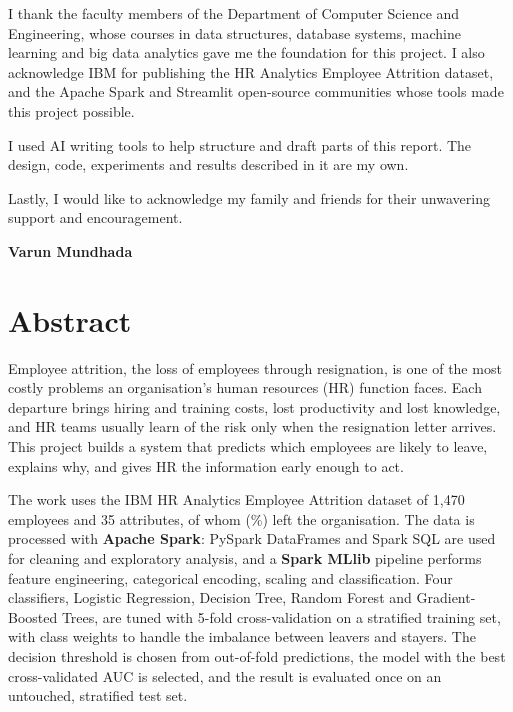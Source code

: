 \documentclass[12pt,a4paper]{report}
\begin{document}
I thank the faculty members of the Department of Computer Science and Engineering, whose courses in data structures, database systems, machine learning and big data analytics gave me the foundation for this project. I also acknowledge IBM for publishing the HR Analytics Employee Attrition dataset, and the Apache Spark and Streamlit open-source communities whose tools made this project possible.

I used AI writing tools to help structure and draft parts of this report. The design, code, experiments and results described in it are my own.

Lastly, I would like to acknowledge my family and friends for their unwavering support and encouragement.

\vspace{1cm}
\hfill \textbf{Varun Mundhada}


\chapter*{Abstract}
\thispagestyle{frontpages}

Employee attrition, the loss of employees through resignation, is one of the most costly problems an organisation's human resources (HR) function faces. Each departure brings hiring and training costs, lost productivity and lost knowledge, and HR teams usually learn of the risk only when the resignation letter arrives. This project builds a system that predicts which employees are likely to leave, explains why, and gives HR the information early enough to act.

The work uses the IBM HR Analytics Employee Attrition dataset of 1,470 employees and 35 attributes, of whom \Leavers{} (\AttrRate\%) left the organisation. The data is processed with \textbf{Apache Spark}: PySpark DataFrames and Spark SQL are used for cleaning and exploratory analysis, and a \textbf{Spark MLlib} pipeline performs feature engineering, categorical encoding, scaling and classification. Four classifiers, Logistic Regression, Decision Tree, Random Forest and Gradient-Boosted Trees, are tuned with 5-fold cross-validation on a stratified training set, with class weights to handle the imbalance between leavers and stayers. The decision threshold is chosen from out-of-fold predictions, the model with the best cross-validated AUC is selected, and the result is evaluated once on an untouched, stratified test set.
\end{document}
